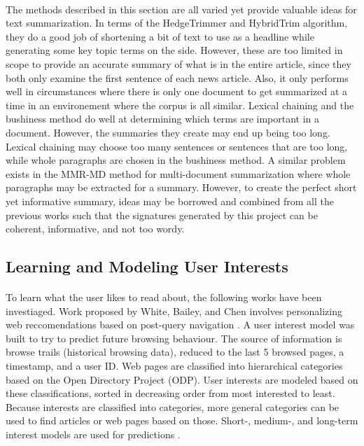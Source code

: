 \documentclass[11pt,titlepage]{report}
\begin{document}
\paragraph{}
The methods described in this section are all varied yet provide valuable ideas for text summarization. In terms of the HedgeTrimmer and HybridTrim algorithm, they do a good job of shortening a bit of text to use as a headline while generating some key topic terms on the side. However, these are too limited in scope to provide an accurate summary of what is in the entire article, since they both only examine the first sentence of each news article. Also, it only performs well in circumstances where there is only one document to get summarized at a time in an environement where the corpus is all similar. Lexical chaining and the bushiness method do well at determining which terms are important in a document. However, the summaries they create may end up being too long. Lexical chaining may choose too many sentences or sentences that are too long, while whole paragraphs are chosen in the bushiness method. A similar problem exists in the MMR-MD method for multi-document summarization where whole paragraphs may be extracted for a summary. However, to create the perfect short yet informative summary, ideas may be borrowed and combined from all the previous works such that the signatures generated by this project can be coherent, informative, and not too wordy. 
\subsection{Learning and Modeling User Interests}
\paragraph{}
To learn what the user likes to read about, the following works have been investiaged. Work proposed by White, Bailey, and Chen involves personalizing web reccomendations based on post-query navigation \cite{web_recc}. A user interest model was built to try to predict future browsing behaviour. The source of information is browse trails (historical browsing data), reduced to the last 5 browsed pages, a timestamp, and a user ID. Web pages are classified into hierarchical categories based on the Open Directory Project (ODP). User interests are modeled based on these classifications, sorted in decreasing order from most interested to least. Because interests are classified into categories, more general categories can be used to find articles or web pages based on those. Short-, medium-, and long-term interest models are used for predictions \cite{web_recc}.
\end{document}
